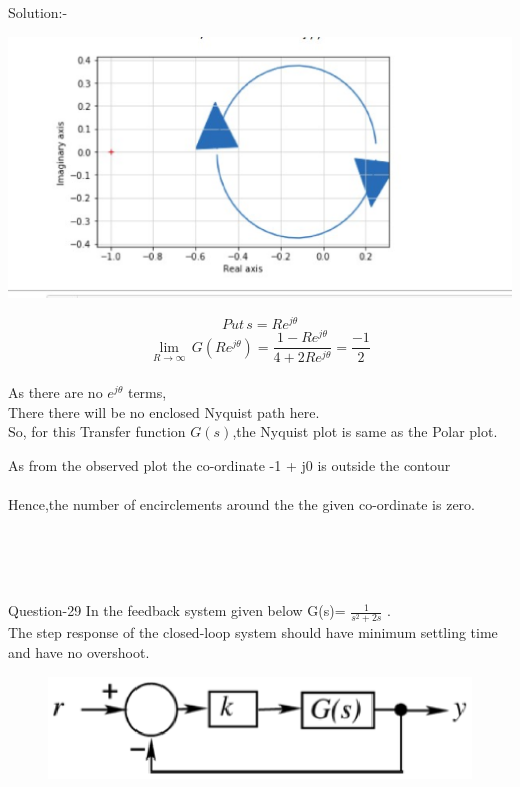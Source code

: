 \documentclass[journal,12pt,twocolumn]{IEEEtran}
\begin{document}
\begin{frame}{Solution:- }
\begin{frame}{}
\end{frame}

\begin{frame}{}
\includegraphics[scale = 0.5]{./figs/updated.eps}
\end{frame}

\begin{frame}{}
    $$Put\,s=Re^{j\theta}$$
    $$\lim_{R\to \infty}\,G(Re^{j\theta})=\frac{1-Re^{j\theta}}{4+2Re^{j\theta}}=\frac{-1}{2}$$ \\
    \bigskip
    As there are no $e^{j\theta}$ terms, 
    \\
    There there will be no enclosed Nyquist path here. 
    \\
    So, for this Transfer function $G(s)$,the Nyquist plot is same as the Polar plot.
    
\end{frame}

\begin{frame}{}
As from the observed plot the co-ordinate -1 + j0 is outside the contour
\\
\bigskip
\\
Hence,the number of encirclements around the the given co-ordinate is zero.
\end{frame}
\\
\\\\
\begin{frame}{Question-29 }
In the feedback system given below G(s)= \(\frac{1}{s^2+2s}\) .\\
The step response of the closed-loop system should have minimum settling time and have no overshoot.

\begin{figure}[h]
    \includegraphics[scale=0.5]{./figs/fig-8.eps}
\end{figure}


\end{frame}
\end{frame}
\end{document}
